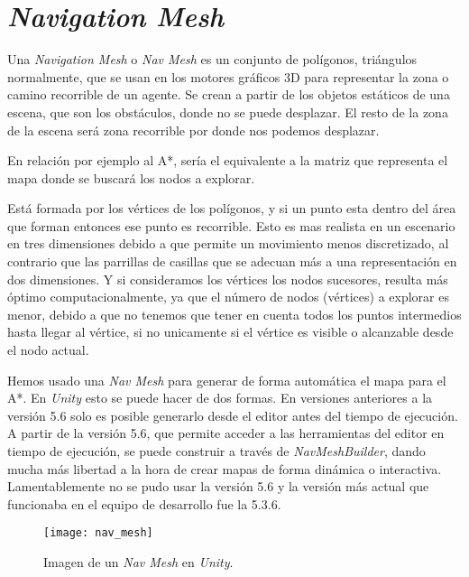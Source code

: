 
\section{\textit{Navigation Mesh}} \label{referenciaNavMesh}
Una \textit{Navigation Mesh} o \textit{Nav Mesh} es un conjunto de polígonos, triángulos normalmente, que se usan en los motores gráficos 3D para representar la zona o camino recorrible de un agente. Se crean a partir de los objetos estáticos de una escena, que son los obstáculos, donde no se puede desplazar. El resto de la zona de la escena será zona recorrible por donde nos podemos desplazar.

En relación por ejemplo al A*, sería el equivalente a la matriz que representa el mapa donde se buscará los nodos a explorar.

Está formada por los vértices de los polígonos, y si un punto esta dentro del área que forman entonces ese punto es recorrible. Esto es mas realista en un escenario en tres dimensiones debido a que permite un movimiento menos discretizado, al contrario que las parrillas de casillas que se adecuan más a una representación en dos dimensiones. Y si consideramos los vértices los nodos sucesores, resulta más óptimo computacionalmente, ya que el número de nodos (vértices) a explorar es menor, debido a que no tenemos que tener en cuenta todos los puntos intermedios hasta llegar al vértice, si no unicamente si el vértice es visible o alcanzable desde el nodo actual.

Hemos usado una \textit{Nav Mesh} para generar de forma automática el mapa para el A*. En \textit{Unity} esto se puede hacer de dos formas. En versiones anteriores a la versión 5.6 solo es posible generarlo desde el editor antes del tiempo de ejecución. A partir de la versión 5.6, que permite acceder a las herramientas del editor en tiempo de ejecución, se puede construir a través de \textit{NavMeshBuilder}, dando mucha más libertad a la hora de crear mapas de forma dinámica o interactiva. Lamentablemente no se pudo usar la versión 5.6 y la versión más actual que funcionaba en el equipo de desarrollo fue la 5.3.6.

\begin{figure}[htpb]
    \centering
    \texttt{[image: nav\_mesh]}
    \caption[Imagen de un \textit{Nav Mesh} en \textit{Unity}]{Imagen de un \textit{Nav Mesh} en \textit{Unity}.}
    \label{fig:basics AFM sketch}
\end{figure}

